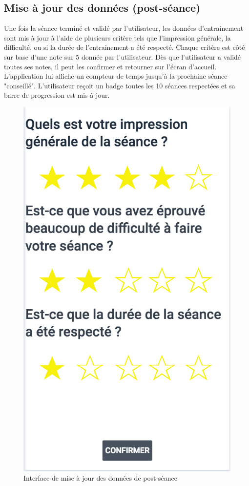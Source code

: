 \subsection{Mise à jour des données (post-séance)}

Une fois la séance terminé et validé par l'utilisateur, les données d'entrainement sont mis à jour à l'aide de plusieurs critère tels que l'impression générale, la difficulté, ou si la durée de l'entrainement a été respecté. Chaque critère est côté sur base d'une note sur 5 donnée par l'utilisateur. Dès que l'utilisateur a validé toutes ses notes, il peut les confirmer et retourner sur l'écran d'accueil. L'application lui affiche un compteur de temps jusqu'à la prochaine séance "conseillé". L'utilisateur reçoit un badge toutes les 10 séances respectées et sa barre de progression est mis à jour.  

\begin{figure}[!h]
\centering
\includegraphics[scale=0.3]{ihms/rating_before_update}
\caption{Interface de mise à jour des données de post-séance}
\end{figure} 

